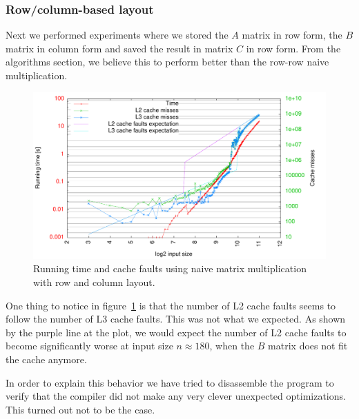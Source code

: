 \subsubsection{Row/column-based layout}
Next we performed experiments where we stored the $A$ matrix in row
form, the $B$ matrix in column form and saved the result in matrix $C$
in row form. From the algorithms section, we believe this to perform
better than the row-row naive multiplication.

\begin{figure}[h!]
  \centering
  \includegraphics[width=\textwidth]{plots/rowcol}
  \caption{Running time and cache faults using naive matrix
    multiplication with row and column layout.}
  \label{fig:rowcol}
\end{figure}

One thing to notice in figure~\ref{fig:rowcol} is that the number of
L2 cache faults seems to follow the number of L3 cache faults. This
was not what we expected. As shown by the purple line at the plot, we
would expect the number of L2 cache faults to become significantly
worse at input size $n \approx 180$, when the $B$ matrix does not fit
the cache anymore.

In order to explain this behavior we have tried to disassemble the
program to verify that the compiler did not make any very clever
unexpected optimizations. This turned out not to be the case.

